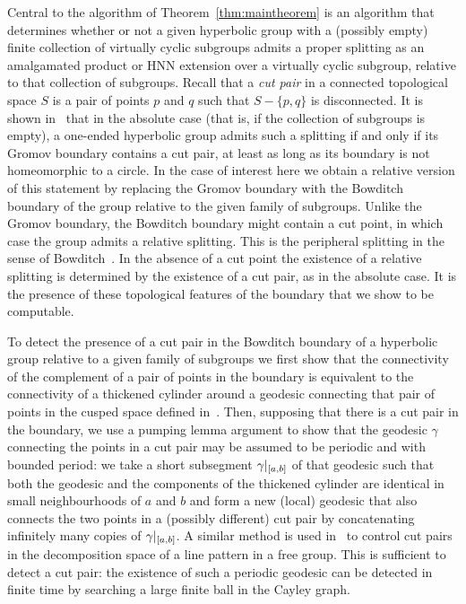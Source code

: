 Central to the algorithm of Theorem~\ref{thm:maintheorem} is an algorithm that
determines whether or not a given hyperbolic group with a (possibly empty)
finite collection of virtually cyclic subgroups admits a proper splitting as an
amalgamated product or HNN extension over a virtually cyclic subgroup, relative
to that collection of subgroups. Recall that a \emph{cut pair} in a connected
topological space $S$ is a pair of points $p$ and $q$ such that $S - \{p, q\}$
is disconnected. It is shown in~\cite{bowditch98} that in the absolute case
(that is, if the collection of subgroups is empty), a one-ended hyperbolic
group admits such a splitting if and only if its Gromov boundary contains a cut
pair, at least as long as its boundary is not homeomorphic to a circle. In the
case of interest here we obtain a relative version of this statement by
replacing the Gromov boundary with the Bowditch boundary of the group relative
to the given family of subgroups. Unlike the Gromov boundary, the Bowditch
boundary might contain a cut point, in which case the group admits a relative
splitting. This is the peripheral splitting in the sense of
Bowditch~\cite{bowditch99b}. In the absence of a cut point the existence of a
relative splitting is determined by the existence of a cut pair, as in the
absolute case. It is the presence of these topological features of the boundary
that we show to be computable.

To detect the presence of a cut pair in the Bowditch boundary of a hyperbolic
group relative to a given family of subgroups  we first show that the
connectivity of the complement of a pair of points in the boundary is
equivalent to the connectivity of a thickened cylinder around a geodesic
connecting that pair of points in the cusped space defined
in~\cite{grovesmanning08}. Then, supposing that there is a cut pair in the
boundary, we use a pumping lemma argument to show that the geodesic $\gamma$
connecting the points in a cut pair may be assumed to be periodic and with
bounded period: we take a short subsegment $\gamma\vert_{[a, b]}$ of that
geodesic such that both the geodesic and the components of the thickened
cylinder are identical in small neighbourhoods of $a$ and $b$ and form a new
(local) geodesic that also connects the two points in a (possibly different)
cut pair by concatenating infinitely many copies of $\gamma\vert_{[a,
b]}$. A similar method is used in~\cite{cashenmacura11} to control cut pairs in
the decomposition space of a line pattern in a free group. This is sufficient
to detect a cut pair: the existence of such a periodic geodesic can be detected
in finite time by searching a large finite ball in the Cayley graph.

